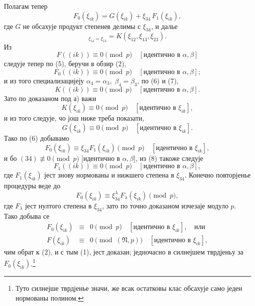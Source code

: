 ﻿\documentclass[11pt]{article}
\providecommand{\frN}{\mathfrak N}
\begin{document}
Полагам тепер
\begin{equation}
        F_0(\xi_{ik})=G(\xi_{ik})+\xi_{34}\,F_1(\xi_{ik}),
\end{equation}
где \(G\) не обсахује продукт степенев делимы с \(\xi_{34}\), и далье
\begin{equation}
        [G]_{\xi_{14}=\xi_{13}}=K(\xi_{12},\xi_{13},\xi_{23}).
\end{equation}
Из
\[
        F((ik))\equiv0\pmod p\quad[\text{идентично в \(\alpha,\beta\)}]
\]
следује тепер по (5), беручи в обзир (2),
\begin{equation}
        F_0((ik))\equiv0\pmod p\quad [\text{идентично в \(\alpha,\beta\)}];
\end{equation}
и из того специализацијеју \(\alpha_4=\alpha_3,\;\beta_4=\beta_3\), по (6) и (7),
\[
        K((ik))\equiv0\pmod p\quad [\text{идентично в \(\alpha,\beta\)}].
\]
Зато по доказаном под а) важи
\[
        K(\xi_{ik})\equiv0\pmod p\quad [\text{идентично в \(\xi_{ik}\)}],
\]
и из того следује, чо још ниже треба показати,
\[
        G(\xi_{ik})\equiv0\pmod p\quad [\text{идентично в \(\xi_{ik}\)}].
\]
Тако по (6) добывамо
\[
        F_0(\xi_{ik})\equiv\xi_{34}F_1(\xi_{ik})\pmod p\quad [\text{идентично в \(\xi_{ik}\)}],
\]
и бо \((34)\not\equiv0\pmod p\) [идентично в \(\alpha,\beta\)], из (8) такоже следује
\[
        F_1((ik))\equiv0\pmod p\quad [\text{идентично в \(\alpha,\beta\)}],
\]
где \(F_1(\xi_{ik})\) јест знову нормованы и нижшего степена в \(\xi_{34}\). Конечно повторјенье процедуры веде до
\[
        F_0(\xi_{ik})\equiv\xi_{34}^{\lambda}F_\lambda(\xi_{ik})\pmod p,
\]
где \(F_\lambda\) јест нултого степена в \(\xi_{34}\), зато по точно доказаном изчезаје модуло \(p\). Тако добыва се
\begin{equation}
\begin{array}{rcl}
        F_0(\xi_{ik})&\equiv&0\pmod p\quad [\text{идентично в \(\xi_{ik}\)}],\quad\text{или}\\
        F(\xi_{ik})&\equiv&0\pmod{(\frN,p)}\quad [\text{идентично в \(\xi_{ik}\)}],
\end{array}
\end{equation}
чим обрат к (2), и с тым (1), јест доказан; једночасно в силнејшем тврдјеньу за \(F_0(\xi_{ik})\).\footnote{Туто силнејше тврдјенье значи, же всак остатковы клас обсахује само једен нормованы полином.}
\end{document}
